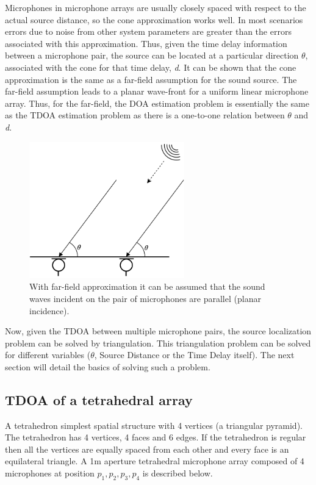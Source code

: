 Microphones in microphone arrays are usually closely spaced with respect to the actual source distance, so the cone approximation works well. In most scenarios errors due to noise from other system parameters are greater than the errors associated with this approximation. Thus, given the time delay information between a microphone pair, the source can be located at a particular direction $\theta$, associated with the cone for that time delay, \textit{d}. It can be shown that the cone approximation is the same as a far-field assumption for the sound source. The far-field assumption leads to a planar wave-front for a uniform linear microphone array. Thus, for the far-field, the DOA estimation problem is essentially the same as the TDOA estimation problem as there is a one-to-one relation between $\theta$ and \textit{d}.

\begin{figure}[!ht]
    \centering
    \includegraphics[width=0.6\textwidth]{Figures/farfieldtheta.png}
    \caption{With far-field approximation it can be assumed that the sound waves incident on the pair of microphones are parallel (planar incidence).}
    \label{fig:my_label}
\end{figure}

Now, given the TDOA between multiple microphone pairs, the source localization problem can be solved by triangulation. This triangulation problem can be solved for different variables ($\theta$, Source Distance or the Time Delay itself). The next section will detail the basics of solving such a problem. 

\subsection{TDOA of a tetrahedral array}\label{sec:TDOAN}

A tetrahedron simplest spatial structure with 4 vertices (a triangular pyramid). The tetrahedron has 4 vertices, 4 faces and 6 edges. If the tetrahedron is regular then all the vertices are equally spaced from each other and every face is an equilateral triangle. A 1m aperture tetrahedral microphone array composed of 4 microphones at position $p_1, p_2, p_3, p_4$ is described below.

